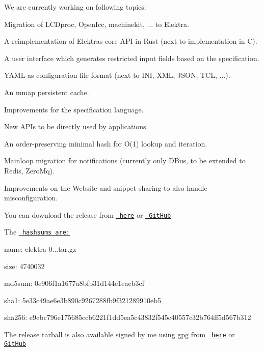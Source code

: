 We are currently working on following topics\+:


\begin{DoxyItemize}
\item Migration of L\+C\+Dproc, Open\+Icc, machinekit, ... to Elektra.
\item A reimplementation of Elektra\textquotesingle{}s core A\+PI in Rust (next to implementation in C).
\item A user interface which generates restricted input fields based on the specification.
\item Y\+A\+ML as configuration file format (next to I\+NI, X\+ML, J\+S\+ON, T\+CL, ...).
\item An mmap persistent cache.
\item Improvements for the specification language.
\item New A\+P\+Is to be directly used by applications.
\item An order-\/preserving minimal hash for O(1) lookup and iteration.
\item Mainloop migration for notifications (currently only D\+Bus, to be extended to Redis, Zero\+Mq).
\item Improvements on the Website and snippet sharing to also handle misconfiguration.
\end{DoxyItemize}

You can download the release from \href{https://www.libelektra.org/ftp/elektra/releases/elektra-0.8.20.tar.gz}{\texttt{ here}} or \href{https://github.com/ElektraInitiative/ftp/blob/master/releases/elektra-0.8.20.tar.gz?raw=true}{\texttt{ Git\+Hub}}

The \href{https://github.com/ElektraInitiative/ftp/blob/master/releases/elektra-0.8.20.tar.gz.hashsum?raw=true}{\texttt{ hashsums are\+:}}


\begin{DoxyItemize}
\item name\+: elektra-\/0...\+tar.\+gz
\item size\+: 4740032
\item md5sum\+: 0e906f1a1677a8bfb31d144e1eaeb3cf
\item sha1\+: 5e33c49ae6e3b890c9267288fb9f321289910eb5
\item sha256\+: e9cbc796e175685ccb6221f1dd5ea5c43832f545c40557c32b764ff5d567b312
\end{DoxyItemize}

The release tarball is also available signed by me using gpg from \href{https://www.libelektra.org/ftp/elektra/releases/elektra-0.8.20.tar.gz.gpg}{\texttt{ here}} or \href{https://github.com/ElektraInitiative/ftp/blob/master/releases//elektra-0.8.20.tar.gz.gpg?raw=true}{\texttt{ Git\+Hub}}


